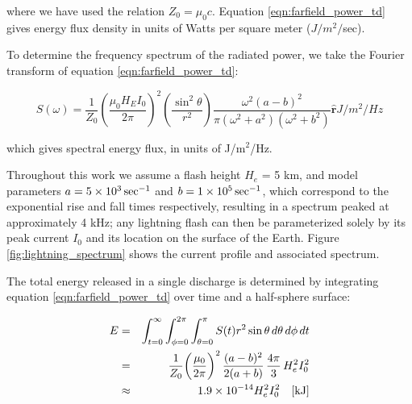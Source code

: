 where we have used the relation $Z_0 = \mu_0 c$. Equation \eqref{eqn:farfield_power_td} gives energy flux density in units of Watts per square meter ($J/m^2/$sec).

To determine the frequency spectrum of the radiated power, we take the Fourier transform of equation \eqref{eqn:farfield_power_td}:

\begin{equation}
\label{eqn:farfield_power_fd}
S(\omega) = \frac{1}{Z_0}\left(\frac{\mu_0 H_E I_0}{2 \pi}\right)^2\left(\frac{\sin^2\theta}{r^2}\right) \frac{\omega^2(a-b)^2}{\pi(\omega^2 + a^2)(\omega^2 + b^2)}  \mathbf{\hat{r}}
\unit{J/m^2/Hz}
\end{equation}

which gives spectral energy flux, in units of J/m$^2$/Hz.

Throughout this work we assume a flash height $H_e$ = 5 km, and model parameters $a=5\times 10^{3}\,\mathrm{sec}^{-1}$ and $b=1\times 10^{5}\,\mathrm{sec}^{-1}$, which correspond to the exponential rise and fall times respectively, resulting in a spectrum peaked at approximately 4 kHz; any lightning flash can then be parameterized solely by its peak current $I_0$ and its location on the surface of the Earth. Figure \ref{fig:lightning_spectrum} shows the current profile and associated spectrum.

The total energy released in a single discharge is determined by integrating equation \eqref{eqn:farfield_power_td} over time and a half-sphere surface:

\begin{eqnarray}
\label{eqn:total_energy_below_iono}
E &= &\int_{t=0}^\infty \int_{\phi=0}^{2\pi} \int_{\theta=0}^\pi  S(t) r^2 \sin\theta\,d\theta\,d\phi\,dt \\
 & = & \frac{1}{Z_0}\bigg(\frac{\mu_0}{2\pi}\bigg)^2 \, \frac{(a - b)^2}{2 (a + b)}  \, \frac{4 \pi}{3} \, H_e^2 I_0^2 \\
 & \approx & 1.9\times 10^{-14}H_e^2 I_0^2 \quad[\mathrm{kJ}]
\end{eqnarray}


